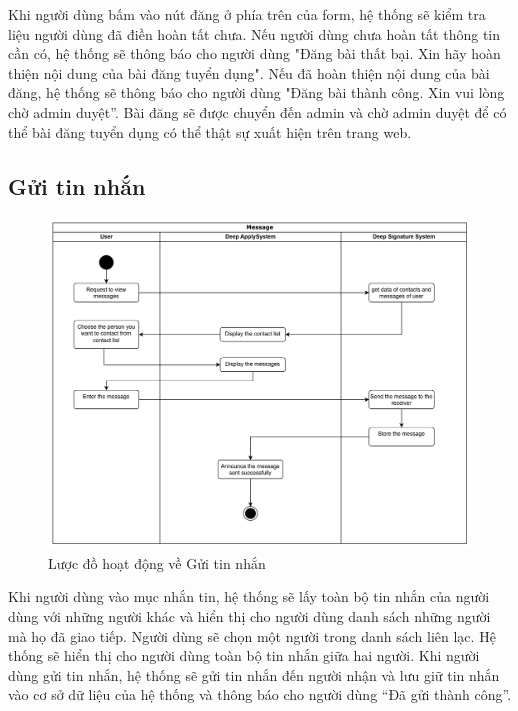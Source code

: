Khi người dùng bấm vào nút đăng ở phía trên của form, hệ thống sẽ kiểm tra liệu người dùng đã điền hoàn tất chưa. Nếu người dùng chưa hoàn tất thông tin cần có, hệ thống sẽ thông báo cho người dùng "Đăng bài thất bại. Xin hãy hoàn thiện nội dung của bài đăng tuyển dụng". Nếu đã hoàn thiện nội dung của bài đăng, hệ thống sẽ thông báo cho người dùng "Đăng bài thành công. Xin vui lòng chờ admin duyệt”. Bài đăng sẽ được chuyển đến admin và chờ admin duyệt để có thể bài đăng tuyển dụng có thể thật sự xuất hiện trên trang web.



\subsection{Gửi tin nhắn}

\begin{figure}[H]

	\centering
    \includegraphics[scale=0.1]{img/Message_workflow.png}
    \caption{Lược đồ hoạt động về Gửi tin nhắn}
\end{figure}

Khi người dùng vào mục nhắn tin, hệ thống sẽ lấy toàn bộ tin nhắn của người dùng với những người khác và hiển thị cho người dùng danh sách những người mà họ đã giao tiếp. Người dùng sẽ chọn một người trong danh sách liên lạc. Hệ thống sẽ hiển thị cho người dùng toàn bộ tin nhắn giữa hai người. Khi người dùng gửi tin nhắn, hệ thống sẽ gửi tin nhắn đến người nhận và lưu giữ tin nhắn vào cơ sở dữ liệu của hệ thống và thông báo cho người dùng “Đã gửi thành công”.


